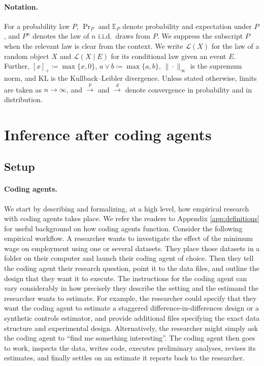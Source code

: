 \documentclass[10pt]{article}
\newcommand{\E}{\mathbb{E}}
\begin{document}
\paragraph{Notation.} For a probability law $P$, $\Pr_P$ and $\E_P$ denote probability and expectation under $P$, and $P^n$ denotes the law of $n$ i.i.d.\ draws from $P$. We suppress the subscript $P$ when the relevant law is clear from the context. We write $\mathcal L(X)$ for the law of a random object $X$ and $\mathcal L(X\mid E)$ for its conditional law given an event $E$. Further, $[x]_+\coloneqq\max\{x,0\}$, $a\vee b\coloneqq \max\{a,b\}$, $\|\cdot\|_\infty$ is the supremum norm, and $\mathrm{KL}$ is the Kullback--Leibler divergence. Unless stated otherwise, limits are taken as $n\to\infty$, and $\stackrel{p}{\longrightarrow}$ and $\xrightarrow{d}$ denote convergence in probability and in distribution.

\section{Inference after coding agents}
\subsection{Setup} \label{sec:setup}

\paragraph{Coding agents.} We start by describing and formalizing, at a high level, how empirical research with coding agents takes place. We refer the readers to Appendix \ref{app:definitions} for useful background on how coding agents function. Consider the following empirical workflow. A researcher wants to investigate the effect of the minimum wage on employment using one or several datasets. They place those datasets in a folder on their computer and launch their coding agent of choice. Then they tell the coding agent their research question, point it to the data files, and outline the design that they want it to execute. The instructions for the coding agent can vary considerably in how precisely they describe the setting and the estimand the researcher wants to estimate. For example, the researcher could specify that they want the coding agent to estimate a staggered difference-in-differences design or a synthetic controls estimator, and provide additional files specifying the exact data structure and experimental design. Alternatively, the researcher might simply ask the coding agent to ``find me something interesting''. The coding agent then goes to work, inspects the data, writes code, executes preliminary analyses, revises its estimates, and finally settles on an estimate it reports back to the researcher.
\end{document}

